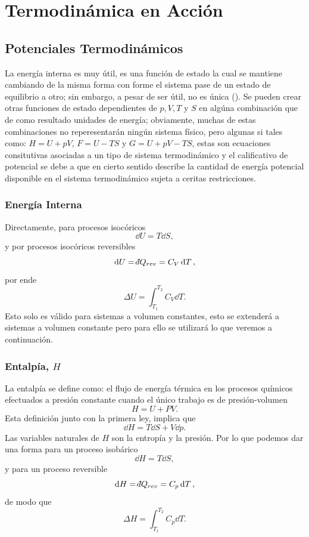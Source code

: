 \chapter{Termodinámica en Acción}

\section{Potenciales Termodinámicos}
La energía interna es muy útil, es una función de estado la cual se mantiene  cambiando de la misma forma con forme el sistema pase de un estado de equilibrio a otro; sin embargo, a pesar de ser útil, no es única (). Se pueden crear otras funciones de estado dependientes de $p, V,T$ y $S$ en algúna combinación que de como resultado unidades de energía; obviamente, muchas de estas combinaciones no reperesentarán ningún sistema físico, pero algunas si tales como: $H = U + pV$, $F = U - TS$ y $G = U + pV - TS$, estas son ecuaciones consitutivas asociadas a un tipo de sistema termodinámico y el calificativo de potencial se debe a que en cierto sentido describe la cantidad de energía potencial disponible en el sistema termodinámico sujeta a ceritas restricciones.

\subsection{Energía Interna}
Directamente, para procesos isocóricos
	$$ \dd{U} = T\dd{S}, $$
y por procesos isocóricos reversibles
	$$ \dd{U} = \dbar Q_{rev} = C_V \dd{T}, $$
por ende
	$$ \Delta U = \int _{T_1} ^{T_2} C_V \dd{T}. $$
Esto solo es válido para sistemas a volumen constantes, esto se extenderá a sistemas a volumen constante pero para ello se utilizará lo que veremos a continuación.

\subsection{Entalpía, $H$}
La entalpía se define como: el flujo de energía térmica en los procesos químicos efectuados a presión constante cuando el único trabajo es de presión-volumen
	$$ H = U + PV. $$
Esta definición junto con la primera ley, implica que
	$$ \dd{H} = T\dd{S} + V \dd{p}. $$
Las variables naturales de $H$ son la entropía y la presión. Por lo que podemos dar una forma para un proceso isobárico
	$$ \dd{H} = T\dd{S}, $$
y para un proceso reversible
	$$ \dd{H} = \dbar Q_{rev} = C_p \dd{T}, $$
de modo que
	$$ \Delta H = \int _{T_1} ^{T_2} C_p \dd{T}. $$

